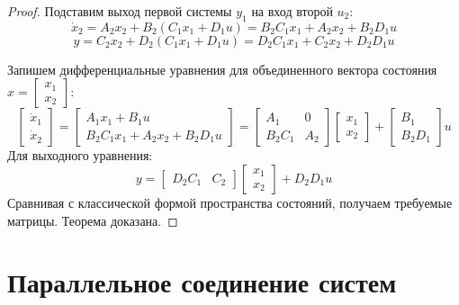 \documentclass[12pt,a4paper]{article}
\begin{document}
\begin{proof}
    Подставим выход первой системы $y_1$ на вход второй $u_2$:
    \begin{equation}
        \dot{x}_2 = A_2 x_2 + B_2(C_1 x_1 + D_1 u) = B_2 C_1 x_1 + A_2 x_2 + B_2 D_1 u
    \end{equation}
    \begin{equation}
        y = C_2 x_2 + D_2(C_1 x_1 + D_1 u) = D_2 C_1 x_1 + C_2 x_2 + D_2 D_1 u
    \end{equation}

    Запишем дифференциальные уравнения для объединенного вектора состояния $x = \begin{bmatrix} x_1 \\ x_2 \end{bmatrix}$:
    \begin{equation}
        \begin{bmatrix} \dot{x}_1 \\ \dot{x}_2 \end{bmatrix} =
        \begin{bmatrix} A_1 x_1 + B_1 u \\ B_2 C_1 x_1 + A_2 x_2 + B_2 D_1 u \end{bmatrix} =
        \begin{bmatrix} A_1 & 0 \\ B_2 C_1 & A_2 \end{bmatrix} \begin{bmatrix} x_1 \\ x_2 \end{bmatrix} +
        \begin{bmatrix} B_1 \\ B_2 D_1 \end{bmatrix} u
    \end{equation}
    Для выходного уравнения:
    \begin{equation}
        y = \begin{bmatrix} D_2 C_1 & C_2 \end{bmatrix} \begin{bmatrix} x_1 \\ x_2 \end{bmatrix} + D_2 D_1 u
    \end{equation}
    Сравнивая с классической формой пространства состояний, получаем требуемые матрицы. Теорема доказана.
\end{proof}

\section{Параллельное соединение систем}
\end{document}
